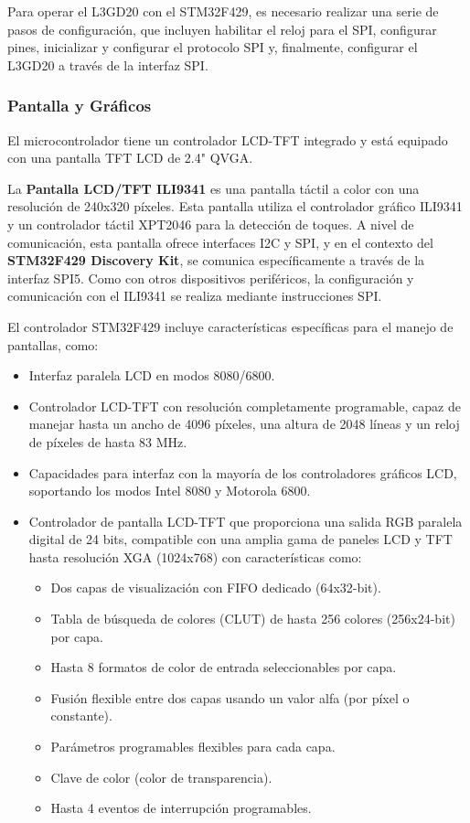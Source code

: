 Para operar el L3GD20 con el STM32F429, es necesario realizar una serie de pasos de configuración, que incluyen habilitar el reloj para el SPI, configurar pines, inicializar y configurar el protocolo SPI y, finalmente, configurar el L3GD20 a través de la interfaz SPI.
\subsubsection{Pantalla y Gráficos}
El microcontrolador tiene un controlador LCD-TFT integrado y está equipado con una pantalla TFT LCD de 2.4" QVGA.

La \textbf{Pantalla LCD/TFT ILI9341} es una pantalla táctil a color con una resolución de 240x320 píxeles. Esta pantalla utiliza el controlador gráfico ILI9341 y un controlador táctil XPT2046 para la detección de toques. A nivel de comunicación, esta pantalla ofrece interfaces I2C y SPI, y en el contexto del \textbf{STM32F429 Discovery Kit}, se comunica específicamente a través de la interfaz SPI5. Como con otros dispositivos periféricos, la configuración y comunicación con el ILI9341 se realiza mediante instrucciones SPI.

El controlador STM32F429 incluye características específicas para el manejo de pantallas, como\cite{STM32F429xxDatasheet}:

\begin{itemize}
    \item Interfaz paralela LCD en modos 8080/6800.
    \item Controlador LCD-TFT con resolución completamente programable, capaz de manejar hasta un ancho de 4096 píxeles, una altura de 2048 líneas y un reloj de píxeles de hasta 83 MHz.
    \item Capacidades para interfaz con la mayoría de los controladores gráficos LCD, soportando los modos Intel 8080 y Motorola 6800.
    \item Controlador de pantalla LCD-TFT que proporciona una salida RGB paralela digital de 24 bits, compatible con una amplia gama de paneles LCD y TFT hasta resolución XGA (1024x768) con características como:
    \begin{itemize}
        \item Dos capas de visualización con FIFO dedicado (64x32-bit).
        \item Tabla de búsqueda de colores (CLUT) de hasta 256 colores (256x24-bit) por capa.
        \item Hasta 8 formatos de color de entrada seleccionables por capa.
        \item Fusión flexible entre dos capas usando un valor alfa (por píxel o constante).
        \item Parámetros programables flexibles para cada capa.
        \item Clave de color (color de transparencia).
        \item Hasta 4 eventos de interrupción programables.
    \end{itemize}
\end{itemize}



